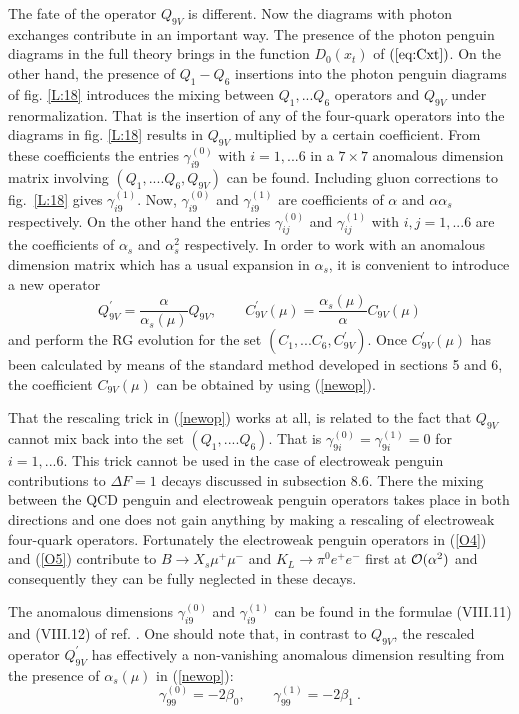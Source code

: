 \documentclass[12pt]{article}
\newcommand{\be}{\begin{equation}}
\newcommand{\ee}{\end{equation}}
\newcommand{\ord}{{\cal O}}
\begin{document}
\begin{itemize}
\begin{itemize}
The fate of the operator $Q_{9V}$ is different. Now the diagrams with
photon exchanges contribute in an important way. The presence of the 
photon penguin diagrams in the full theory brings in the function
$D_0(x_t)$ of $(\ref{eq:Cxt})$. On the other hand, the presence of
$Q_1-Q_6$ insertions into the photon penguin diagrams of fig. 
\ref{L:18}
introduces the mixing between $Q_1,...Q_6$ operators and $Q_{9V}$
under renormalization. That is the insertion of any of the four-quark 
operators into the diagrams in fig. \ref{L:18} results in 
$Q_{9V}$ multiplied
by a certain coefficient. From these coefficients the entries
$\gamma^{(0)}_{i9}$ with $i=1,...6$ in
a $7\times 7$ anomalous dimension matrix involving 
$(Q_1,....Q_6,Q_{9V})$ can be found. 
Including gluon corrections to fig.~\ref{L:18} gives
$\gamma^{(1)}_{i9}$.
Now, 
$\gamma^{(0)}_{i9}$ and $\gamma^{(1)}_{i9}$ are coefficients of
$\alpha$ and $\alpha\alpha_s$ respectively. On the other hand
the entries $\gamma^{(0)}_{ij}$ and $\gamma^{(1)}_{ij}$ with
$i,j=1,...6$ are the coefficients of $\alpha_s$ and $\alpha_s^2$
respectively. In order to work with an anomalous dimension
matrix which has a usual expansion in $\alpha_s$, it is convenient
to introduce a new operator
\be\label{newop}
Q^\prime_{9V}=\frac{\alpha}{\alpha_s(\mu)} Q_{9V},
\quad\quad
C^\prime_{9V}(\mu)=\frac{\alpha_s(\mu)}{\alpha} C_{9V}(\mu)
\ee
and perform the RG evolution for the set $(C_1,...C_6,C^\prime_{9V})$.
Once $C^\prime_{9V}(\mu)$ has been calculated by means of the standard
method developed in sections 5 and 6, the coefficient $C_{9V}(\mu)$
can be obtained by using (\ref{newop}).

That the rescaling trick in (\ref{newop}) works at all, is related to
the fact that $Q_{9V}$ cannot mix back into the set $(Q_1,....Q_6)$.
That is $\gamma^{(0)}_{9i}=\gamma^{(1)}_{9i}=0$ for $i=1,...6.$
This trick cannot be used in the case of electroweak penguin contributions
to $\Delta F=1$ decays discussed in subsection 8.6. 
There the mixing between
the QCD penguin and electroweak penguin operators takes place in both
directions and one does not gain anything by making a rescaling of
electroweak four-quark operators. Fortunately the electroweak penguin
operators in (\ref{O4}) and (\ref{O5}) contribute to
$B \to X_s \mu^+\mu^-$ and $K_L\to \pi^0 e^+e^-$ first at $\ord(\alpha^2)$
and consequently they can be fully neglected in these decays.

The anomalous dimensions $\gamma^{(0)}_{i9}$ and $\gamma^{(1)}_{i9}$
can be found in the formulae (VIII.11) and (VIII.12) of ref. 
\cite{BBL}. One
should note that, in contrast to $Q_{9V}$, the rescaled operator
$Q^\prime_{9V}$ has effectively a non-vanishing anomalous dimension resulting
from the presence of $\alpha_s(\mu)$ in (\ref{newop}):
\be
\gamma^{(0)}_{99}=-2\beta_0, \quad\quad \gamma^{(1)}_{99}=-2 \beta_1~.
\ee


\end{itemize}
\end{itemize}
\end{document}

